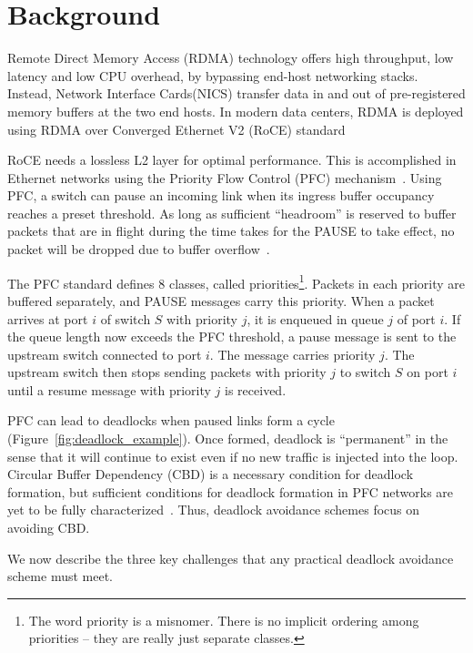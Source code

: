\section{Background}
\label{sec:background}
 Remote Direct Memory Access (RDMA) technology offers high
throughput, low latency and low CPU overhead, by bypassing end-host networking
stacks. Instead, Network Interface Cards(NICS) transfer data in and out of
pre-registered memory buffers at the two end hosts.  In modern data centers,
RDMA is deployed using RDMA over Converged Ethernet V2 (RoCE)
standard~\cite{roce,rroce}

 RoCE needs a lossless L2 layer for optimal performance. This is
accomplished in Ethernet networks using the Priority Flow Control (PFC)
mechanism~\cite{pfc}.  Using PFC, a switch can pause an incoming link when its
ingress buffer occupancy reaches a preset threshold. As long as sufficient
``headroom'' is reserved to buffer packets that are in flight during the time
takes for the PAUSE to take effect, no packet will be dropped due to buffer
overflow~\cite{cisco-whitepaper,dcqcn}. 

The PFC standard defines 8 classes, called priorities\footnote{The word priority
is a misnomer. There is no implicit ordering among priorities -- they are really
just separate classes.}. Packets in each priority are buffered separately, and
PAUSE messages carry this priority.  When a packet arrives at port $i$ of switch
$S$ with priority $j$, it is enqueued in queue $j$ of port $i$. If the queue
length now exceeds the PFC threshold, a pause message is sent to the upstream
switch connected to port $i$. The message carries priority $j$. The upstream
switch then stops sending packets with priority $j$ to switch $S$ on port $i$
until a resume message with priority $j$ is received.

 PFC can lead to deadlocks when paused links form a cycle
(Figure~\ref{fig:deadlock_example}). Once formed, deadlock is ``permanent'' in
the sense that it will continue to exist even if no new traffic is injected into
the loop. Circular Buffer Dependency (CBD) is a necessary condition for deadlock
formation, but sufficient conditions for deadlock formation in PFC networks are
yet to be fully characterized~\cite{hu2016deadlocks}. Thus, deadlock avoidance
schemes focus on avoiding CBD. 

We now describe the three key challenges that any practical deadlock avoidance
scheme must meet.


